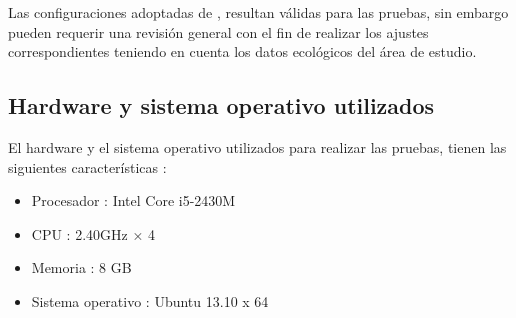 Las configuraciones adoptadas de
\cite{otero2006stochastic,otero2008stochastic,rueda1990temperature}, resultan válidas para las
pruebas, sin embargo pueden requerir una revisión general con el fin de realizar los ajustes
correspondientes teniendo en cuenta los datos ecológicos del área de estudio.

\subsection{Hardware y sistema operativo utilizados}
El hardware y el sistema operativo utilizados para realizar las pruebas, tienen las siguientes
características :
\begin{itemize}
\item Procesador : Intel Core i5-2430M
\item CPU : 2.40GHz × 4
\item Memoria : 8 GB
\item Sistema operativo : Ubuntu 13.10 x 64
\end{itemize}

